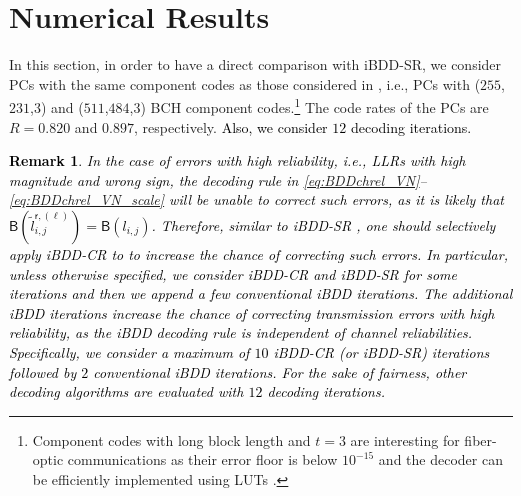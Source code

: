 \documentclass[journal]{IEEEtran}
\newtheorem{remark}{Remark}
\newcommand{\BB}{\mathsf{B}}
\newcommand{\SH}{\textcolor{black}}
\newcommand{\GL}{\textcolor{black}}
\newcommand{\AGc}{\textcolor{black}}
\newcommand{\GLC}[1]{\textcolor{black}{\textbf{\textit{#1}}}}
\begin{document}
\section{Numerical  Results}\label{Simres}

In this section, in order to have a direct comparison with iBDD-SR, we consider PCs with the same component codes as those considered in \cite{sheikhTCOM19}, i.e., PCs with ($255$,$231$,$3$) and ($511$,$484$,$3$) BCH component codes.\footnote{Component codes with long block length and 
 $t=3$ are interesting for fiber-optic communications as their error floor 
 is below $10^{-15}$ and the decoder can be efficiently implemented using LUTs \cite[Appendix~I]{staircase_frank}.} The code rates of the PCs are  $R=0.820$ and $0.897$, respectively. \SH{Also, we  consider $12$ decoding iterations.} 

\SH{\begin{remark}\label{remarkapp}
In the case of  errors with high reliability, i.e., LLRs with high magnitude and  wrong sign, the decoding rule in \eqref{eq:BDDchrel_VN}--\eqref{eq:BDDchrel_VN_scale} will be unable to correct such errors, as it is likely that $\BB(\tilde{l}_{i,j}^{\mathsf r, (\ell)})=\BB({l}_{i,j})$. Therefore, similar to  iBDD-SR \cite[Sec.~VI]{sheikhTCOM19}, one should selectively apply iBDD-CR to to increase the chance of correcting such errors. In particular, unless otherwise specified, we consider iBDD-CR and iBDD-SR for some iterations and then we append a few conventional iBDD iterations. The \GL{additional} iBDD iterations increase the chance of correcting transmission errors with high reliability, as the iBDD decoding rule is independent of channel reliabilities. \GL{Specifically}, we consider a maximum of $10$ iBDD-CR (or iBDD-SR) iterations followed by $2$ conventional iBDD iterations. For the sake of fairness, other decoding algorithms are evaluated with $12$ decoding iterations.
\end{remark}}


\end{document}
